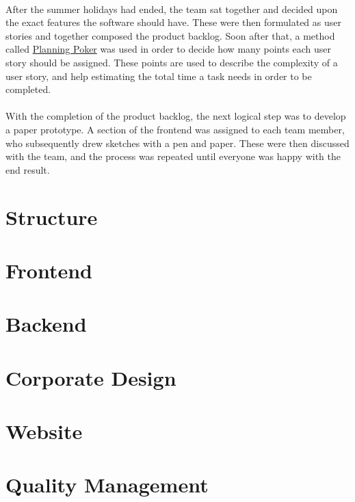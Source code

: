 \paragraph{}
After the summer holidays had ended, the team sat together and decided upon the exact features the software should have. These were then formulated as user stories and together composed the product backlog. Soon after that, a method called \href{https://en.wikipedia.org/wiki/Planning_poker}{Planning Poker} was used in order to decide how many points each user story should be assigned. These points are used to describe the complexity of a user story, and help estimating the total time a task needs in order to be completed.

\paragraph{}
With the completion of the product backlog, the next logical step was to develop a paper prototype. A section of the frontend was assigned to each team member, who subsequently drew sketches with a pen and paper. These were then discussed with the team, and the process was repeated until everyone was happy with the end result.




\section{Structure}
\def \kapitelautor {Clemens Stadlbauer}

\section{Frontend}
%
\section{Backend}
%

\section{Corporate Design}
%
\section{Website}
%

\section{Quality Management}
\def \kapitelautor {Julian Lorenz}

